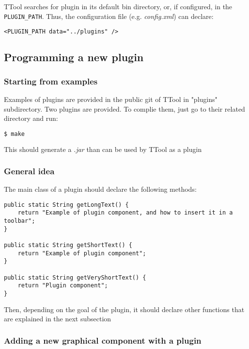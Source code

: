 \documentclass[12pt]{article}
\begin{document}
TTool searches for plugin in its default bin directory, or, if configured, in the \texttt{PLUGIN\_PATH}. Thus, the configuration file (e.g. \textit{config.xml}) can declare:
\begin{lstlisting}
<PLUGIN_PATH data="../plugins" />
\end{lstlisting}

\subsection{Programming a new plugin}



\subsubsection{Starting from examples}
Examples of plugins are provided in the public git of TTool in "plugins" subdirectory. Two plugins are provided. To complie them, just go to their related directory and run:
\begin{verbatim}
$ make
\end{verbatim}
This should generate a \textit{.jar} than can be used by TTool as a plugin


\subsubsection{General idea}
The main class of a plugin should declare the following methods:
\begin{lstlisting}
public static String getLongText() {
	return "Example of plugin component, and how to insert it in a toolbar";
}

public static String getShortText() {
	return "Example of plugin component";
}
    
public static String getVeryShortText() {
	return "Plugin component";
}
\end{lstlisting}
Then, depending on the goal of the plugin, it should declare other functions that are explained in the next subsection

\subsubsection{Adding a new graphical component with a plugin}
\end{document}
